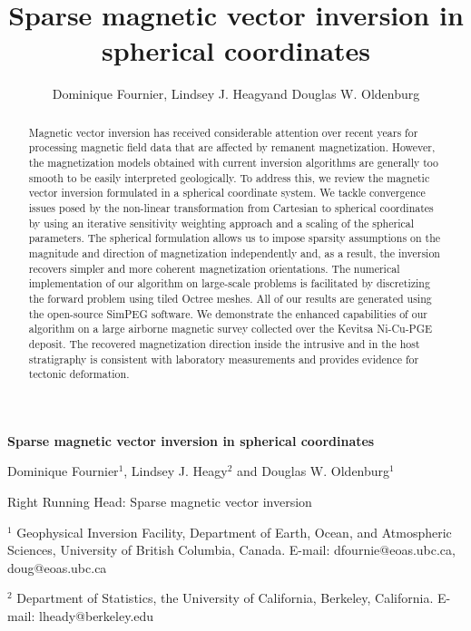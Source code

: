 \documentclass[paper]{geophysics}
\begin{document}
\title{Sparse magnetic vector inversion in spherical coordinates}

\begin{center}
{\LARGE\textbf{Sparse magnetic vector inversion in spherical coordinates}}

\author{Dominique Fournier\footnotemark[1], Lindsey J. Heagy\footnotemark[2] and Douglas W. Oldenburg\footnotemark[1]}
{Dominique Fournier$^1$, Lindsey J. Heagy$^2$ and Douglas W. Oldenburg$^1$

\vspace{10 mm}
Right Running Head: Sparse magnetic vector inversion
\vspace{10 mm}


$^1$ Geophysical Inversion Facility, Department of Earth, Ocean, and Atmospheric Sciences,
University of British Columbia, Canada. E-mail: dfournie@eoas.ubc.ca, doug@eoas.ubc.ca

$^2$ Department of Statistics, the University of California, Berkeley, California. E-mail: lheady@berkeley.edu
}
\end{center}



\begin{abstract}
Magnetic vector inversion has received considerable attention over recent years for processing magnetic field data that are affected by remanent magnetization. However, the magnetization models obtained with current inversion algorithms are generally too smooth to be easily interpreted geologically. To address this, we review the magnetic vector inversion formulated in a spherical coordinate system. We tackle convergence issues posed by the non-linear transformation from Cartesian to spherical coordinates by using an iterative sensitivity weighting approach and a scaling of the spherical parameters. The spherical formulation allows us to impose sparsity assumptions on the magnitude and direction of magnetization independently and, as a result, the inversion recovers simpler and more coherent magnetization orientations. The numerical implementation of our algorithm on large-scale problems is facilitated by discretizing the forward problem using tiled Octree meshes. All of our results are generated using the open-source SimPEG software. We demonstrate the enhanced capabilities of our algorithm on a large airborne magnetic survey collected over the Kevitsa Ni-Cu-PGE deposit. The recovered magnetization direction inside the intrusive and in the host stratigraphy is consistent with laboratory measurements and provides evidence for tectonic deformation.
\end{abstract}
\end{document}
